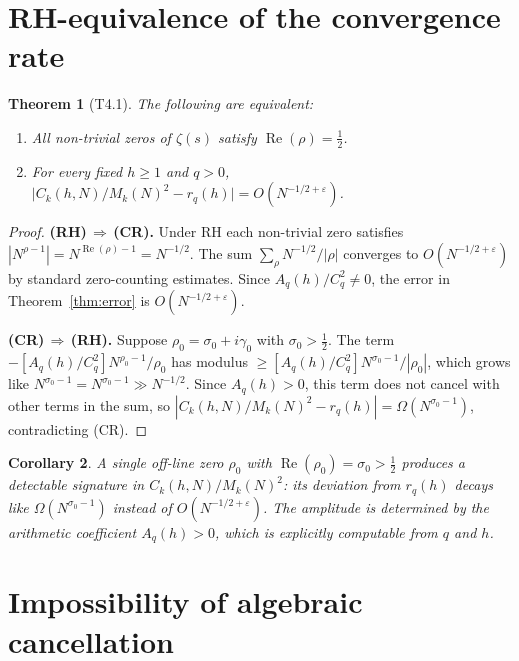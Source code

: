 \documentclass[11pt]{amsart}
\newtheorem{theorem}{Theorem}[section]
\newtheorem{corollary}[theorem]{Corollary}
\theoremstyle{definition}
\theoremstyle{remark}
\renewcommand{\Re}{\operatorname{Re}}
\newcommand{\half}{\tfrac12}
\begin{document}
\section{RH-equivalence of the convergence rate}
\label{sec:rh-equiv}

\begin{theorem}[T4.1]\label{thm:rh}
  The following are equivalent:
  \begin{enumerate}
    \item[(RH)] All non-trivial zeros of $\zeta(s)$ satisfy $\Re(\rho)=\half$.
    \item[(CR)] For every fixed $h\ge 1$ and $q>0$,
      $\bigl|C_k(h,N)/M_k(N)^2 - r_q(h)\bigr| = O(N^{-1/2+\varepsilon})$.
  \end{enumerate}
\end{theorem}
\begin{proof}
  \textbf{(RH)\,$\Rightarrow$\,(CR).}
  Under RH each non-trivial zero satisfies $|N^{\rho-1}|=N^{\Re(\rho)-1}=N^{-1/2}$.
  The sum $\sum_\rho N^{-1/2}/|\rho|$ converges to $O(N^{-1/2+\varepsilon})$ by
  standard zero-counting estimates.  Since $A_q(h)/C_q^2\ne 0$, the error in
  Theorem~\ref{thm:error} is $O(N^{-1/2+\varepsilon})$.

  \textbf{(CR)\,$\Rightarrow$\,(RH).}
  Suppose $\rho_0=\sigma_0+i\gamma_0$ with $\sigma_0>\half$.
  The term $-[A_q(h)/C_q^2] N^{\rho_0-1}/\rho_0$ has modulus $\ge [A_q(h)/C_q^2]N^{\sigma_0-1}/|\rho_0|$,
  which grows like $N^{\sigma_0-1}=N^{\sigma_0-1}\gg N^{-1/2}$.
  Since $A_q(h)>0$, this term does not cancel with other terms in the sum,
  so $|C_k(h,N)/M_k(N)^2-r_q(h)|=\Omega(N^{\sigma_0-1})$, contradicting (CR).
\end{proof}

\begin{corollary}
  A single off-line zero $\rho_0$ with $\Re(\rho_0)=\sigma_0>\half$ produces a
  detectable signature in $C_k(h,N)/M_k(N)^2$: its deviation from $r_q(h)$
  decays like $\Omega(N^{\sigma_0-1})$ instead of $O(N^{-1/2+\varepsilon})$.
  The amplitude is determined by the arithmetic coefficient $A_q(h)>0$, which is
  explicitly computable from $q$ and $h$.
\end{corollary}

\section{Impossibility of algebraic cancellation}
\label{sec:impossibility}
\end{document}
